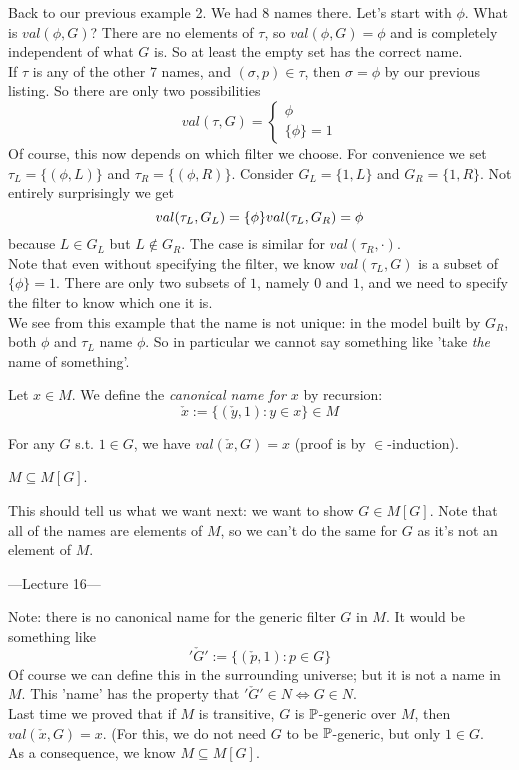 \documentclass[a4paper]{article}
\begin{document}
Back to our previous example 2. We had 8 names there. Let's start with $\phi$. What is $val(\phi,G)$? There are no elements of $\tau$, so $val(\phi,G) = \phi$ and is completely independent of what $G$ is. So at least the empty set has the correct name.\\
If $\tau$ is any of the other 7 names, and $(\sigma,p) \in \tau$, then $\sigma = \phi$ by our previous listing. So there are only two possibilities
\[
val(\tau,G) = \left\{\begin{array}{ll}
\phi\\
\{\phi\}=1
\end{array}
\right.
\]
Of course, this now depends on which filter we choose. For convenience we set $\tau_L = \{(\phi,L)\}$ and $\tau_R = \{(\phi,R)\}$. Consider $G_L = \{1,L\}$ and $G_R = \{1,R\}$. Not entirely surprisingly we get
\[
val(\tau_L,G_L) = \{\phi\}\\
val(\tau_L,G_R) = \phi
\]
because $L \in G_L$ but $L \not\in G_R$. The case is similar for $val(\tau_R,\cdot)$.\\
Note that even without specifying the filter, we know $val(\tau_L,G)$ is a subset of $\{\phi\}=1$. There are only two subsets of $1$, namely $0$ and $1$, and we need to specify the filter to know which one it is.\\
We see from this example that the name is not unique: in the model built by $G_R$, both $\phi$ and $\tau_L$ name $\phi$. So in particular we cannot say something like 'take \emph{the} name of something'.

\begin{defi}
Let $x \in M$. We define the \emph{canonical name for $x$} by recursion:
\[
\check{x} := \{(\check{y},1):y \in x\} \in M
\]
\end{defi}

\begin{prop}
For any $G$ s.t. $1 \in G$, we have $val(\check{x},G) = x$ (proof is by $\in$-induction).
\end{prop}

\begin{coro}
$M \subseteq M[G]$.
\end{coro}

This should tell us what we want next: we want to show $G \in M[G]$. Note that all of the names are elements of $M$, so we can't do the same for $G$ as it's not an element of $M$.

---Lecture 16---

Note: there is no canonical name for the generic filter $G$ in $M$. It would be something like
\[
'\check{G}' := \{(\check{p},1): p \in G\}
\]
Of course we can define this in the surrounding universe; but it is not a name in $M$. This 'name' has the property that $'\check{G}' \in N \iff G \in N$.\\
Last time we proved that if $M$ is transitive, $G$ is $\P$-generic over $M$, then $val(\check{x},G) = x$. (For this, we do not need $G$ to be $\P$-generic, but only $1 \in G$.\\
As a consequence, we know $M \subseteq M[G]$.
\end{document}
